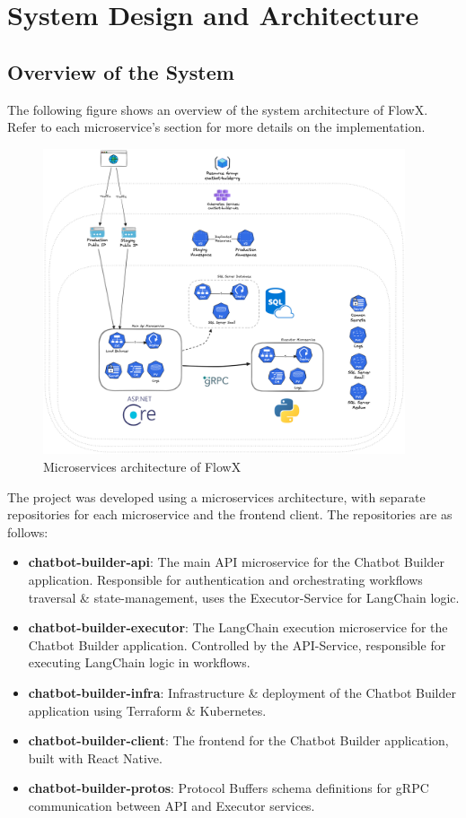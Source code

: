 \section{System Design and Architecture}

\subsection{Overview of the System}
The following figure shows an overview of the system architecture of FlowX.
Refer to each microservice's section for more details on the implementation.

\begin{figure}[H]
    \centering
    \includegraphics[width=0.95\textwidth]{assets/SystemDesign.png}
    \caption{Microservices architecture of FlowX}
    \label{fig:system_design}
\end{figure}

The project was developed using a microservices architecture, with separate repositories for each microservice and the frontend client. The repositories are as follows:
\begin{itemize}
    \item \textbf{chatbot-builder-api}: The main API microservice for the Chatbot Builder application. Responsible for authentication and orchestrating workflows traversal \& state-management, uses the Executor-Service for LangChain logic.
    \item \textbf{chatbot-builder-executor}: The LangChain execution microservice for the Chatbot Builder application. Controlled by the API-Service, responsible for executing LangChain logic in workflows.
    \item \textbf{chatbot-builder-infra}: Infrastructure \& deployment of the Chatbot Builder application using Terraform \& Kubernetes.
    \item \textbf{chatbot-builder-client}: The frontend for the Chatbot Builder application, built with React Native.
    \item \textbf{chatbot-builder-protos}: Protocol Buffers schema definitions for gRPC communication between API and Executor services.
\end{itemize}

